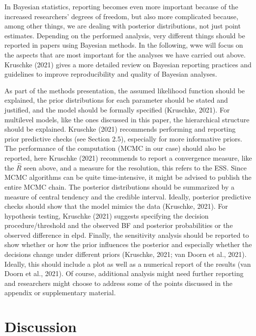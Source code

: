 \documentclass[
  doc,12pt,floatsintext]{apa7}
\begin{document}
In Bayesian statistics, reporting becomes even more important because of the increased researchers' degrees of freedom, but also more complicated because, among other things, we are dealing with posterior distributions, not just point estimates. Depending on the performed analysis, very different things should be reported in papers using Bayesian methods. In the following, wwe will focus on the aspects that are most important for the analyses we have carried out above. Kruschke (2021) gives a more detailed review on Bayesian reporting practices and guidelines to improve reproducibility and quality of Bayesian analyses.

As part of the methods presentation, the assumed likelihood function should be explained, the prior distributions for each parameter should be stated and justified, and the model should be formally specified (Kruschke, 2021). For multilevel models, like the ones discussed in this paper, the hierarchical structure should be explained. Kruschke (2021) recommends performing and reporting prior predictive checks (see Section 2.5), especially for more informative priors. The performance of the computation (MCMC in our case) should also be reported, here Kruschke (2021) recommends to report a convergence measure, like the \(\hat{R}\) seen above, and a measure for the resolution, this refers to the ESS. Since MCMC algorithms can be quite time-intensive, it might be advised to publish the entire MCMC chain. The posterior distributions should be summarized by a measure of central tendency and the credible interval. Ideally, posterior predictive checks should show that the model mimics the data (Kruschke, 2021). For hypothesis testing, Kruschke (2021) suggests specifying the decision procedure/threshold and the observed BF and posterior probabilities or the observed difference in elpd. Finally, the sensitivity analysis should be reported to show whether or how the prior influences the posterior and especially whether the decisions change under different priors (Kruschke, 2021; van Doorn et al., 2021). Ideally, this should include a plot as well as a numerical report of the results (van Doorn et al., 2021). Of course, additional analysis might need further reporting and researchers might choose to address some of the points discussed in the appendix or supplementary material.

\section{Discussion}\label{discussion}
\end{document}
